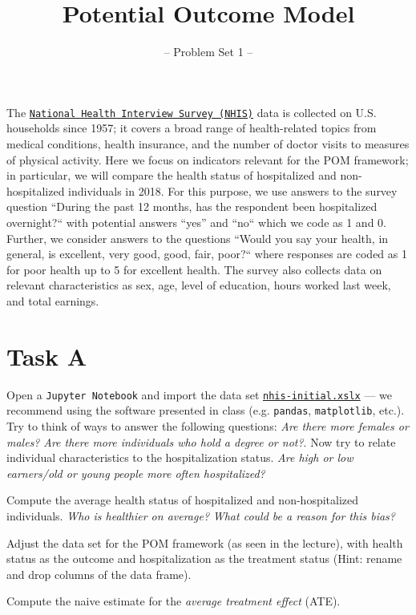 

\title{Potential Outcome Model}
\subtitle{-- Problem Set 1 --}
\date{}

\maketitle\vspace{-2cm}

The \href{https://www.cdc.gov/nchs/nhis/index.htm}{\texttt{National Health Interview Survey (NHIS)}} data is collected on U.S. households since 1957; it covers a broad range of health-related topics from medical conditions, health insurance, and the number of doctor visits to measures of physical activity. Here we focus on indicators relevant for the POM framework; in particular, we will compare the health status of hospitalized and non-hospitalized individuals in 2018.
For this purpose, we use answers to the survey question ``During the past 12 months, has the respondent been hospitalized overnight?`` with potential answers ``yes'' and ``no`` which we code as 1 and 0. Further, we consider answers to the questions ``Would you say your health, in general, is excellent, very good, good, fair, poor?`` where responses are coded as 1 for poor health up to 5 for excellent health. The survey also collects data on relevant characteristics as sex, age, level of education, hours worked last week, and total earnings.

\section*{Task A} 

\begin{boenumerate}

  \item Open a \texttt{Jupyter Notebook} and import the data set \href{https://github.com/HumanCapitalAnalysis/microeconometrics/tree/master/problem-sets/01-potential-outcome-model/data}{\texttt{nhis-initial.xslx}} --- we recommend using the software presented in class (e.g. \texttt{pandas}, \texttt{matplotlib}, etc.). Try to think of ways to answer the following questions: \emph{Are there more females or males?} \emph{Are there more individuals who hold a degree or not?}. Now try to relate individual characteristics to the hospitalization status. \emph{Are high or low earners/old or young people more often hospitalized?}

  \item Compute the average health status of hospitalized and non-hospitalized individuals. \emph{Who is healthier on average?} \emph{What could be a reason for this bias?}

  \item Adjust the data set for the POM framework (as seen in the lecture), with health status as the outcome and hospitalization as the treatment status (Hint: rename and drop columns of the data frame).

  \item Compute the naive estimate for the \emph{average treatment effect} (ATE).

\end{boenumerate}


